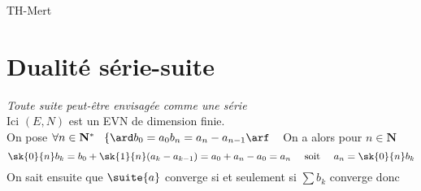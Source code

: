 		{TH-Mert}
		
\section{Dualité série-suite}
		
		\textit{Toute suite peut-être envisagée comme une série}\\
		
		Ici $(E,N)$ est un EVN de dimension finie.\\${}$ \\On pose $\forall n\in\mathbf{N}^* ~~ \left\{ \ard  b_0 = a_0 \\ b_n = a_n - a_{n-1} \arf
		\right.~~$ On a alors pour $n\in \mathbf{N}$ \\
		\[ \sk{0}{n} b_k = b_0 + \sk{1}{n} (a_k - a_{k-1} ) = a_0 +a_n - a_0 = a_n ~~~~\mathrm{soit} ~~~~ a_n = \sk{0}{n} b_k\]
		On sait ensuite que $\suite{a}$ converge si et seulement si $\sum b_k$ converge donc 
		
		\begin{center}
		\end{center} ${}$ \\

		\begin{center}
		\fin
		\end{center}
